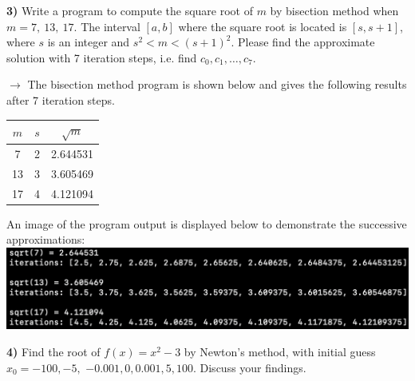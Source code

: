 \documentclass[12pt,a4paper]{article}
\newcommand{\prob}[2]{\textbf{#1)} #2}
\begin{document}
\prob{3}{Write a program to compute the square root of $m$ by bisection method when $m = 7,~13,~17$. The interval $[a,b]$ where the square root is located is $[s,s+1]$, where $s$ is an integer and $s^2 < m < (s+1)^2$. Please find the approximate solution with 7 iteration steps, i.e. find $c_0,c_1,\hdots,c_7$.}

$\rightarrow$ The bisection method program is shown below and gives the following results after 7 iteration steps.
\begin{table}[H]
\begin{center}
\begin{tabular}{c|c|c}
$m$ & $s$ & $\sqrt{m}$ \\
\hline
7 & 2 & 2.644531 \\
13 & 3 & 3.605469 \\
17 & 4 & 4.121094 \\
\end{tabular}
\end{center}
\end{table}

An image of the program output is displayed below to demonstrate the successive approximations:
\bef
\includegraphics[scale=0.75]{fig1.png}
\eef


\prob{4}{Find the root of $f(x) = x^2 - 3$ by Newton's method, with initial guess $x_0 = -100,-5,$ $-0.001,0,0.001,5,100$. Discuss your findings.}
\end{document}
